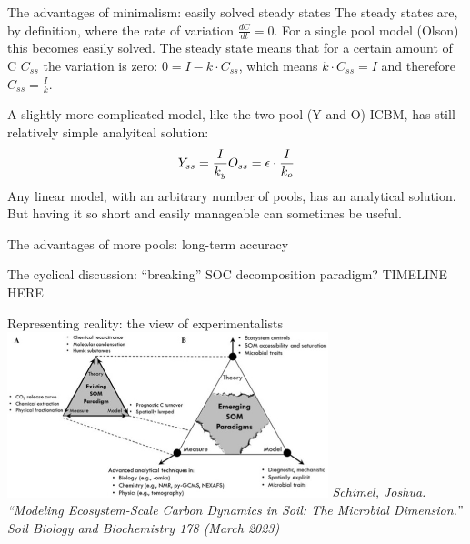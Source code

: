 \documentclass[
  ignorenonframetext,
]{beamer}
\begin{document}
\begin{frame}{The advantages of minimalism: easily solved steady states}
\protect\hypertarget{the-advantages-of-minimalism-easily-solved-steady-states-1}{}
The steady states are, by definition, where the rate of variation
\(\frac{dC}{dt}=0\). For a single pool model (Olson) this becomes easily
solved. The steady state means that for a certain amount of C \(C_{ss}\)
the variation is zero: \(0 = I - k \cdot C_{ss}\), which means
\(k \cdot C_{ss} = I\) and therefore \(C_{ss}=\frac{I}{k}\).

A slightly more complicated model, like the two pool (Y and O) ICBM, has
still relatively simple analyitcal solution: \[
Y_{ss}=\frac{I}{k_y}\\
O_{ss}=\epsilon\cdot\frac{I}{k_o}
\] Any linear model, with an arbitrary number of pools, has an
analytical solution. But having it so short and easily manageable can
sometimes be useful.
\end{frame}

\begin{frame}{The advantages of more pools: long-term accuracy}
\protect\hypertarget{the-advantages-of-more-pools-long-term-accuracy}{}
\end{frame}

\begin{frame}{The cyclical discussion: ``breaking'' SOC decomposition
paradigm?}
\protect\hypertarget{the-cyclical-discussion-breaking-soc-decomposition-paradigm}{}
TIMELINE HERE
\end{frame}

\begin{frame}{Representing reality: the view of experimentalists}
\protect\hypertarget{representing-reality-the-view-of-experimentalists}{}
\includegraphics[width=0.7\textwidth,height=\textheight]{Schimel.jpg}
\emph{Schimel, Joshua. ``Modeling Ecosystem-Scale Carbon Dynamics in
Soil: The Microbial Dimension.'' Soil Biology and Biochemistry 178
(March 2023)}
\end{frame}
\end{document}
